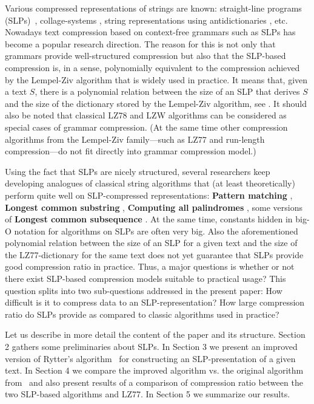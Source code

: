 ﻿\documentclass[10pt, conference, compsocconf]{IEEEtran}
\begin{document}
Various compressed representations of strings are known: straight-line programs (SLPs)~\cite{SLPConstruction},
collage-systems \cite{collages}, string representations using antidictionaries \cite{antidictionaries}, etc. Nowadays
text compression based on context-free grammars such as SLPs has become a popular research direction. The reason for
this is not only that grammars provide well-structured compression but also that the SLP-based compression is,
in a sense, polynomially equivalent to the compression achieved by the Lempel-Ziv algorithm that is widely used in
practice. It means that, given a text $S$, there is a polynomial relation between the size of an SLP that
derives $S$ and the size of the dictionary stored by the Lempel-Ziv algorithm, see \cite{SLPConstruction}. It should
also be noted that classical LZ78 \cite{LZ78} and LZW \cite{LZW} algorithms can be considered as special cases of grammar
compression. (At the same time other compression algorithms from the Lempel-Ziv family---such as LZ77 \cite{LZ77} and
run-length compression---do not fit directly into grammar compression model.)

Using the fact that SLPs are nicely structured, several researchers keep developing analogues of classical string
algorithms that (at least theoretically) perform quite well on SLP-compressed representations: \textbf{Pattern matching}
\cite{PM_and_HD}, \textbf{Longest common substring} \cite{LCSubstring}, \textbf{Computing all palindromes} \cite{LCSubstring}, some
versions of \textbf{Longest common subsequence} \cite{LCS_P}. At the same time, constants hidden in big-O notation for
algorithms on SLPs are often very big. Also the aforementioned polynomial relation between the size of an SLP for a
given text and the size of the LZ77-dictionary for the same text does not yet guarantee that SLPs provide good
compression ratio in practice. Thus, a major questions is whether or not there exist SLP-based compression models suitable
to practical usage? This question splits into two sub-questions addressed in the present paper: How difficult is it to
compress data to an SLP-representation? How large compression ratio do SLPs provide as compared to
classic algorithms used in practice?

Let us describe in more detail the content of the paper and its structure. Section 2 gathers some preliminaries about
SLPs. In Section 3 we present an improved version of Rytter's algorithm~\cite{SLPConstruction} for constructing
an SLP-presentation of a given text. In Section 4 we compare the improved algorithm vs. the original algorithm
from~\cite{SLPConstruction} and also present results of a comparison of compression ratio between the two SLP-based
algorithms and LZ77. In Section 5 we summarize our results.
\end{document}
